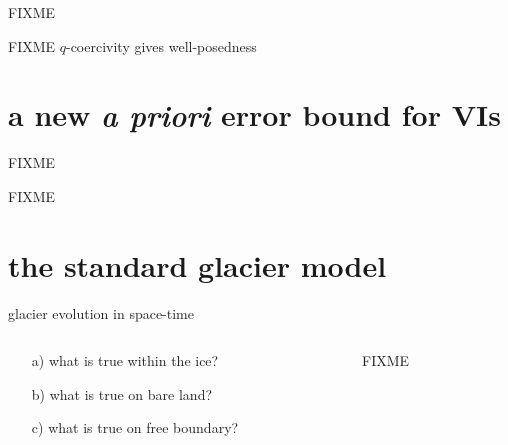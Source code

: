 \documentclass[10pt,svgnames]{beamer}
\begin{document}
\begin{frame}{FIXME}

FIXME  $q$-coercivity gives well-posedness
\end{frame}


\section{a new \emph{a priori} error bound for VIs}

\begin{frame}{FIXME}

FIXME
\end{frame}


\section{the standard glacier model}

\begin{frame}{glacier evolution in space-time }

\bigskip \bigskip

\begin{columns}
\begin{column}{0.28\textwidth}
\begin{itemize}
\item[a)] what is true within the {\color{RoyalBlue} ice}?
\item[b)] what is true on {\color{OliveDrab} bare land}?
\item[c)] what is true on {\color{Salmon} free boundary}?
\end{itemize}\end{column}
\begin{column}{0.72\textwidth}
FIXME %
\end{column}
\end{columns}
\end{frame}
\end{document}
